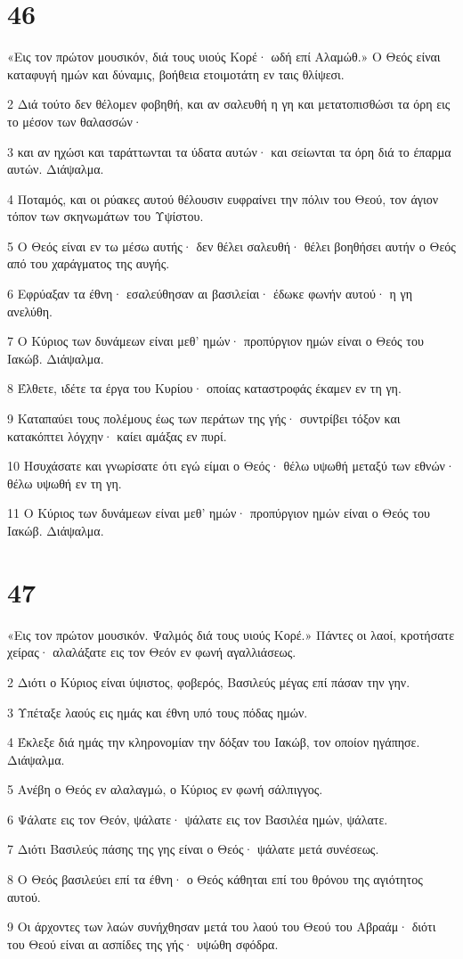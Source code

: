 \chapter{46}

\par «Εις τον πρώτον μουσικόν, διά τους υιούς Κορέ· ωδή επί Αλαμώθ.» Ο Θεός είναι καταφυγή ημών και δύναμις, βοήθεια ετοιμοτάτη εν ταις θλίψεσι.
\par 2 Διά τούτο δεν θέλομεν φοβηθή, και αν σαλευθή η γη και μετατοπισθώσι τα όρη εις το μέσον των θαλασσών·
\par 3 και αν ηχώσι και ταράττωνται τα ύδατα αυτών· και σείωνται τα όρη διά το έπαρμα αυτών. Διάψαλμα.
\par 4 Ποταμός, και οι ρύακες αυτού θέλουσιν ευφραίνει την πόλιν του Θεού, τον άγιον τόπον των σκηνωμάτων του Υψίστου.
\par 5 Ο Θεός είναι εν τω μέσω αυτής· δεν θέλει σαλευθή· θέλει βοηθήσει αυτήν ο Θεός από του χαράγματος της αυγής.
\par 6 Εφρύαξαν τα έθνη· εσαλεύθησαν αι βασιλείαι· έδωκε φωνήν αυτού· η γη ανελύθη.
\par 7 Ο Κύριος των δυνάμεων είναι μεθ' ημών· προπύργιον ημών είναι ο Θεός του Ιακώβ. Διάψαλμα.
\par 8 Έλθετε, ιδέτε τα έργα του Κυρίου· οποίας καταστροφάς έκαμεν εν τη γη.
\par 9 Καταπαύει τους πολέμους έως των περάτων της γής· συντρίβει τόξον και κατακόπτει λόγχην· καίει αμάξας εν πυρί.
\par 10 Ησυχάσατε και γνωρίσατε ότι εγώ είμαι ο Θεός· θέλω υψωθή μεταξύ των εθνών· θέλω υψωθή εν τη γη.
\par 11 Ο Κύριος των δυνάμεων είναι μεθ' ημών· προπύργιον ημών είναι ο Θεός του Ιακώβ. Διάψαλμα.

\chapter{47}

\par «Εις τον πρώτον μουσικόν. Ψαλμός διά τους υιούς Κορέ.» Πάντες οι λαοί, κροτήσατε χείρας· αλαλάξατε εις τον Θεόν εν φωνή αγαλλιάσεως.
\par 2 Διότι ο Κύριος είναι ύψιστος, φοβερός, Βασιλεύς μέγας επί πάσαν την γην.
\par 3 Υπέταξε λαούς εις ημάς και έθνη υπό τους πόδας ημών.
\par 4 Έκλεξε διά ημάς την κληρονομίαν την δόξαν του Ιακώβ, τον οποίον ηγάπησε. Διάψαλμα.
\par 5 Ανέβη ο Θεός εν αλαλαγμώ, ο Κύριος εν φωνή σάλπιγγος.
\par 6 Ψάλατε εις τον Θεόν, ψάλατε· ψάλατε εις τον Βασιλέα ημών, ψάλατε.
\par 7 Διότι Βασιλεύς πάσης της γης είναι ο Θεός· ψάλατε μετά συνέσεως.
\par 8 Ο Θεός βασιλεύει επί τα έθνη· ο Θεός κάθηται επί του θρόνου της αγιότητος αυτού.
\par 9 Οι άρχοντες των λαών συνήχθησαν μετά του λαού του Θεού του Αβραάμ· διότι του Θεού είναι αι ασπίδες της γής· υψώθη σφόδρα.

